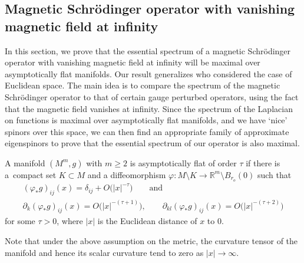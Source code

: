 \documentclass[10pt,a4paper]{amsart}
\numberwithin{equation}{section}
\begin{document}
\subsection{Magnetic Schr\"odinger operator with vanishing magnetic field at infinity}

In this section, we prove that the essential spectrum of a magnetic Schr\"odinger operator with vanishing magnetic field at infinity will be maximal over asymptotically flat manifolds. Our result generalizes \cite[Theorem~6.1]{CFKS} who considered the case of Euclidean space. The main idea is to compare the spectrum of the magnetic Schr\"odinger operator to that of certain gauge perturbed operators, using the fact that the magnetic field vanishes at infinity. Since the spectrum of the Laplacian on functions is maximal over asymptotically flat manifolds, and we have `nice' spinors over this space, we can then find an appropriate family of approximate eigenspinors to prove that the essential spectrum of our operator is also maximal.

\begin{Definition}
A manifold $(M^m,g)$ with $m\geq 2$ is asymptotically flat of order $\tau$ if there is a~compact set $K\subset M$ and a diffeomorphism
$\varphi\colon M \setminus K \to \mathbb{R}^m \setminus B_{r_o}(0)$ such that
\begin{gather*}
(\varphi_* g)_{ij} (x) = \delta_{ij} + O\bigl(|x|^{-\tau}\bigr) \qquad \text{and}\\
\partial_k (\varphi_* g)_{ij} (x) = O\bigr(|x|^{-(\tau+1)}\bigr), \qquad \partial_{kl} (\varphi_* g)_{ij} (x)= O\bigl(|x|^{-(\tau+2)}\bigr)
\end{gather*}
for some $\tau>0$, where $|x|$ is the Euclidean distance of $x$ to $0$.
\end{Definition}

Note that under the above assumption on the metric, the curvature tensor of the manifold and hence its scalar curvature tend to zero as $|x|\to \infty$.
\end{document}
